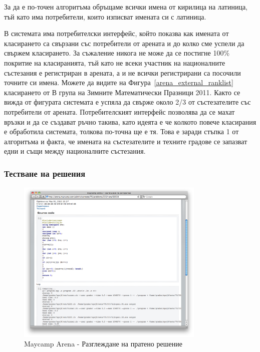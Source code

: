 \documentclass[a4paper,12pt]{article}
\begin{document}
  За да е по-точен алгоритъма обръщаме всички имена от кирилица на латиница, тъй като има потребители, които изписват имената си с латиница.
  
  В системата има потребителски интерфейс, който показва как имената от класирането са свързани със потребители от арената и до колко сме успели да свържем класирането. За съжаление никога не може да се постигне 100\% покритие на класиранията, тъй като не всеки участник на националните състезания е регистриран в арената, а и не всички регистрирани са посочили точните си имена. Можете да видите на Фигура~\ref{arena_external_ranklist} класирането от В група на Зимните Математически Празници 2011. Както се вижда от фигурата системата е успяла да свърже около 2/3 от състезателите със потребители от арената. Потребителският интерфейс позволява да се махат връзки и да се създават ръчно такива, като идеята е че колкото повече класирания е обработила системата, толкова по-точна ще е тя. Това е заради стъпка 1 от алгоритъма и факта, че имената на състезателите и техните градове се запазват едни и същи между националните състезания.
  
  \subsubsection{Тестване на решения}

  \begin{figure}[ht]
    \begin{center}
      \includegraphics[width=0.8\textwidth]{images/maycamp_arena_admin_run.png}
    \end{center}
    \caption{Maycamp Arena - Разглеждане на пратено решение}
    \label{arena_external_run}
  \end{figure}
  
\end{document}

